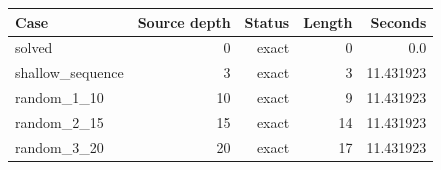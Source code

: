 {\small
\begin{tabular}{lrrrr}
\hline
Case & Source depth & Status & Length & Seconds \\
\hline
solved & 0 & exact & 0 & 0.0 \\
shallow\_sequence & 3 & exact & 3 & 11.431923 \\
random\_1\_10 & 10 & exact & 9 & 11.431923 \\
random\_2\_15 & 15 & exact & 14 & 11.431923 \\
random\_3\_20 & 20 & exact & 17 & 11.431923 \\
\hline
\end{tabular}
}
